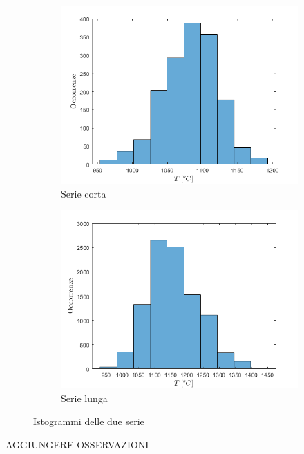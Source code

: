 \begin{figure} [H]
	
	\begin{subfigure}{0.49\textwidth}
		\centering
		\includegraphics[width=0.99\linewidth]{chapters/1-misureT/istogrammashort}
		\caption{Serie corta}
		\label{fig:istogrammashort}
	\end{subfigure}%
	\begin{subfigure}{0.49\textwidth}
		\centering
		\includegraphics[width=0.99\linewidth]{chapters/1-misureT/istogrammalong}
		\caption{Serie lunga}
		\label{fig:istogrammalong}
	\end{subfigure}
\caption{Istogrammi delle due serie}	
\label{fig:istboth}
\end{figure}
AGGIUNGERE OSSERVAZIONI
